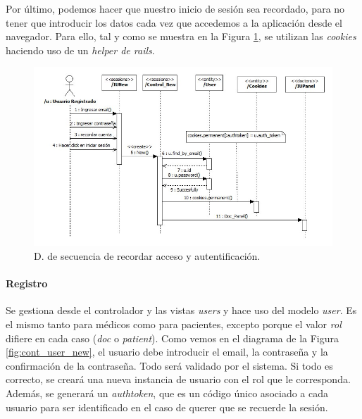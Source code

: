 				Por último, podemos hacer que nuestro inicio de sesión sea recordado, para no tener que introducir los datos cada vez que accedemos a la aplicación desde el navegador. Para ello, tal y como se muestra en la Figura \ref{fig:cont_user_login_remember}, se utilizan las \textit{cookies} haciendo uso de un \textit{helper de rails}.
				
					\begin{figure}[H]
					  \centering
					    \includegraphics[width=16cm]{img/jpg/secuencia/20_user_login_remember.jpg}
					  \caption{D. de secuencia de recordar acceso y autentificación.}
					  \label{fig:cont_user_login_remember}
					\end{figure}
				
			
				\paragraph{Registro} %
				\label{subp:cont_registro}
				
					Se gestiona desde el controlador y las vistas \textit{users} y hace uso del modelo \textit{user}. Es el mismo tanto para médicos como para pacientes, excepto porque el valor \textit{rol} difiere en cada caso (\textit{doc} o \textit{patient}). Como vemos en el diagrama de la Figura \ref{fig:cont_user_new}, el usuario debe introducir el email, la contraseña y la confirmación de la contraseña. Todo será validado por el sistema. Si todo es correcto, se creará una nueva instancia de usuario con el rol que le corresponda. Además, se generará un \textit{authtoken}, que es un código único asociado a cada usuario para ser identificado en el caso de querer que se recuerde la sesión.
					
